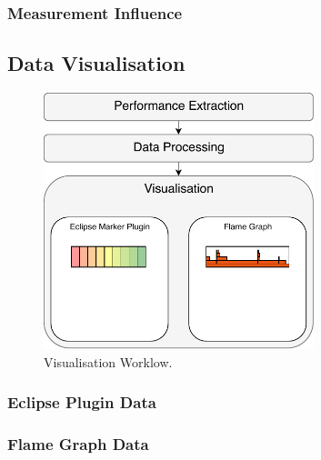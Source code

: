 \subsubsection{Measurement Influence}


\subsection{Data Visualisation}
\label{visualisation}

\begin{figure}
  \centering
  \includegraphics[width=0.7\textwidth]{images/workflow_visual_expanded}
  \caption{Visualisation Worklow.}
  \label{perf_extr_workflow}
\end{figure}

\subsubsection{Eclipse Plugin Data}

\subsubsection{Flame Graph Data}

